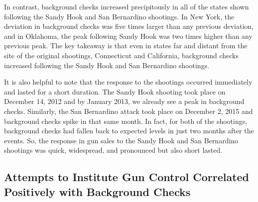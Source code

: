 \documentclass[9pt,twocolumn,twoside,lineno]{pnas-new}
\begin{document}
In contrast, background checks increased precipitously in all of the states shown following the Sandy Hook and San Bernardino shootings. In New York, the deviation in background checks was five times larger than any previous deviation, and in Oklahoma, the peak following Sandy Hook was two times higher than any previous peak. The key takeaway is that even in states far and distant from the site of the original shootings, Connecticut and California, background checks increased following the Sandy Hook and San Bernardino shootings. 

It is also helpful to note that the response to the shootings occurred immediately and lasted for a short duration. The Sandy Hook shooting took place on December 14, 2012 and by January 2013, we already see a peak in background checks. Similarly, the San Bernardino attack took place on December 2, 2015 and background checks spike in that same month. In fact, for both of the shootings, background checks had fallen back to expected levels in just two months after the events. So, the response in gun sales to the Sandy Hook and San Bernardino shootings was quick, widespread, and pronounced but also short lasted. 
\subsection{Attempts to Institute Gun Control Correlated Positively with Background Checks}
\end{document}
